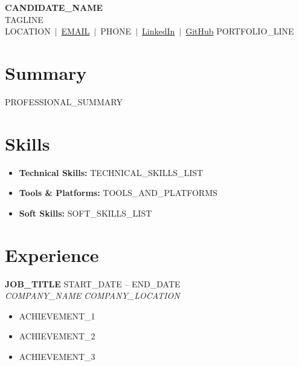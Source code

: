 \documentclass[11pt,letterpaper]{article}
\begin{document}
\begin{center}
  {\Huge \textbf{{{CANDIDATE_NAME}}}} \\[4pt]
  {\large {{TAGLINE}}} \\[6pt]
  {{LOCATION}}
  $\,|\,$ \href{mailto:{{EMAIL}}}{{{EMAIL}}}
  $\,|\,$ {{PHONE}}
  $\,|\,$ \href{{{LINKEDIN_URL}}}{LinkedIn}
  $\,|\,$ \href{https://github.com/{{GITHUB_USERNAME}}}{GitHub}
  {{PORTFOLIO_LINE}}
\end{center}

\vspace{4pt}

\section{Summary}

{{PROFESSIONAL_SUMMARY}}

\section{Skills}

\begin{itemize}
  \item \textbf{Technical Skills:} {{TECHNICAL_SKILLS_LIST}}
  \item \textbf{Tools \& Platforms:} {{TOOLS_AND_PLATFORMS}}
  \item \textbf{Soft Skills:} {{SOFT_SKILLS_LIST}}
\end{itemize}

\section{Experience}

\textbf{{{JOB_TITLE}}} \hfill {{START_DATE}} -- {{END_DATE}} \\
\textit{{{COMPANY_NAME}}} \hfill \textit{{{COMPANY_LOCATION}}}
\begin{itemize}
  \item {{ACHIEVEMENT_1}}
  \item {{ACHIEVEMENT_2}}
  \item {{ACHIEVEMENT_3}}
\end{itemize}
\end{document}
